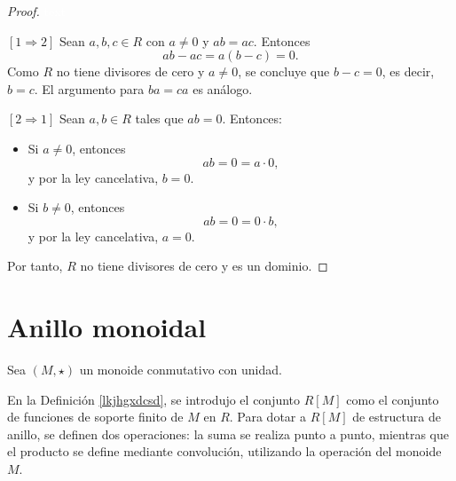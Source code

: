 \begin{proof}
	\textcolor{white}{text}
	
	\medskip
	\noindent $[1 \Rightarrow 2]$ Sean \( a, b, c \in R \) con \( a \ne 0 \) y \( ab = ac \). Entonces
	\[
	ab - ac = a(b - c) = 0.
	\]
	Como \( R \) no tiene divisores de cero y \( a \ne 0 \), se concluye que \( b - c = 0 \), es decir, \( b = c \). El argumento para \( ba = ca \) es análogo.
	
	\medskip
	\noindent $[2 \Rightarrow 1]$ Sean \( a, b \in R \) tales que \( ab = 0 \). Entonces:
	\begin{itemize}
		\item Si \( a \ne 0 \), entonces
		\[
		ab = 0 = a \cdot 0,
		\]
		y por la ley cancelativa, \( b = 0 \).
		
		\item Si \( b \ne 0 \), entonces
		\[
		ab = 0 = 0 \cdot b,
		\]
		y por la ley cancelativa, \( a = 0 \).
	\end{itemize}
	Por tanto, \( R \) no tiene divisores de cero y es un dominio.
\end{proof}












\section{Anillo monoidal}

Sea \( (M, \star) \) un monoide conmutativo con unidad.

\begin{definicion}\label{lkjhgxdcsd}
\end{definicion}

\begin{observacion}
\end{observacion}


En la Definición \ref{lkjhgxdcsd}, se introdujo el conjunto \( R[M] \) como el conjunto de funciones de soporte finito de \( M \) en \( R \). Para dotar a \( R[M] \) de estructura de anillo, se definen dos operaciones: la suma se realiza punto a punto, mientras que el producto se define mediante convolución, utilizando la operación del monoide \( M \).

